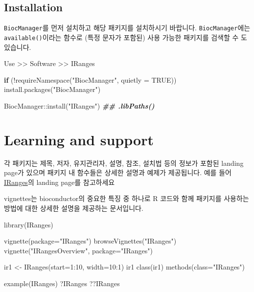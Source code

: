 \documentclass[
]{book}
\newenvironment{Shaded}{\begin{snugshade}}{\end{snugshade}}
\newcommand{\AttributeTok}[1]{\textcolor[rgb]{0.77,0.63,0.00}{#1}}
\newcommand{\ConstantTok}[1]{\textcolor[rgb]{0.00,0.00,0.00}{#1}}
\newcommand{\ControlFlowTok}[1]{\textcolor[rgb]{0.13,0.29,0.53}{\textbf{#1}}}
\newcommand{\DecValTok}[1]{\textcolor[rgb]{0.00,0.00,0.81}{#1}}
\newcommand{\DocumentationTok}[1]{\textcolor[rgb]{0.56,0.35,0.01}{\textbf{\textit{#1}}}}
\newcommand{\FunctionTok}[1]{\textcolor[rgb]{0.00,0.00,0.00}{#1}}
\newcommand{\NormalTok}[1]{#1}
\newcommand{\OtherTok}[1]{\textcolor[rgb]{0.56,0.35,0.01}{#1}}
\newcommand{\SpecialCharTok}[1]{\textcolor[rgb]{0.00,0.00,0.00}{#1}}
\newcommand{\StringTok}[1]{\textcolor[rgb]{0.31,0.60,0.02}{#1}}
\begin{document}
\hypertarget{installation}{%
\subsection{Installation}\label{installation}}

\texttt{BiocManager}를 먼저 설치하고 해당 패키지를 설치하시기 바랍니다. \texttt{BiocManager}에는 \texttt{available()}이라는 함수로 (특정 문자가 포함된) 사용 가능한 패키지를 검색할 수 도 있습니다.

Use \textgreater\textgreater{} Software \textgreater\textgreater{} IRanges

\begin{Shaded}
\begin{Highlighting}[]
\ControlFlowTok{if}\NormalTok{ (}\SpecialCharTok{!}\FunctionTok{requireNamespace}\NormalTok{(}\StringTok{"BiocManager"}\NormalTok{, }\AttributeTok{quietly =} \ConstantTok{TRUE}\NormalTok{))}
    \FunctionTok{install.packages}\NormalTok{(}\StringTok{"BiocManager"}\NormalTok{)}

\NormalTok{BiocManager}\SpecialCharTok{::}\FunctionTok{install}\NormalTok{(}\StringTok{"IRanges"}\NormalTok{)}
\DocumentationTok{\#\# .libPaths()}
\end{Highlighting}
\end{Shaded}

\hypertarget{learning-and-support}{%
\section{Learning and support}\label{learning-and-support}}

각 패키지는 제목, 저자, 유지관리자, 설명, 참조, 설치법 등의 정보가 포함된 landing page가 있으며 패키지 내 함수들은 상세한 설명과 예제가 제공됩니다. 예를 들어 \href{http://bioconductor.org/packages/release/bioc/html/IRanges.html}{IRanges}의 landing page를 참고하세요

vignettes는 bioconductor의 중요한 특징 중 하나로 R 코드와 함께 패키지를 사용하는 방법에 대한 상세한 설명을 제공하는 문서입니다.

\begin{Shaded}
\begin{Highlighting}[]
\FunctionTok{library}\NormalTok{(IRanges)}

\FunctionTok{vignette}\NormalTok{(}\AttributeTok{package=}\StringTok{"IRanges"}\NormalTok{)}
\FunctionTok{browseVignettes}\NormalTok{(}\StringTok{"IRanges"}\NormalTok{)}
\FunctionTok{vignette}\NormalTok{(}\StringTok{"IRangesOverview"}\NormalTok{, }\AttributeTok{package=}\StringTok{"IRanges"}\NormalTok{)}

\NormalTok{ir1 }\OtherTok{\textless{}{-}} \FunctionTok{IRanges}\NormalTok{(}\AttributeTok{start=}\DecValTok{1}\SpecialCharTok{:}\DecValTok{10}\NormalTok{, }\AttributeTok{width=}\DecValTok{10}\SpecialCharTok{:}\DecValTok{1}\NormalTok{)}
\NormalTok{ir1}
\FunctionTok{class}\NormalTok{(ir1)}
\FunctionTok{methods}\NormalTok{(}\AttributeTok{class=}\StringTok{"IRanges"}\NormalTok{)}

\FunctionTok{example}\NormalTok{(IRanges)}
\NormalTok{?IRanges}
\NormalTok{??IRanges}
\end{Highlighting}
\end{Shaded}
\end{document}
